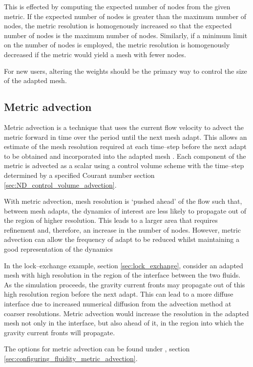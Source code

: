 This is effected by computing the expected number of nodes from the given metric. If the expected
number of nodes is greater than the maximum number of nodes, the metric resolution is homogenously
increased so that the expected number of nodes is the maximum number of nodes. Similarly, if a minimum
limit on the number of nodes is employed, the metric resolution is homogenously decreased if the metric
would yield a mesh with fewer nodes.

For new users, altering the weights should be the primary way to control the
size of the adapted mesh. 

\subsection{Metric advection}
\label{section:metric_advection_general}
Metric advection is a technique that uses the current flow velocity to advect the metric forward in time over the period until the next mesh adapt. This allows an estimate of the mesh resolution required at each time--step before the next adapt to be obtained and incorporated into the adapted mesh \citep{wilson_phdthesis_2009}. Each component of the metric is advected as a scalar using a control volume scheme with the time--step determined by a specified Courant number section \ref{sec:ND_control_volume_advection}. 

With metric advection, mesh resolution is `pushed ahead' of the flow such that, between mesh adapts, the dynamics of interest are less likely to propagate out of the region of higher resolution. This leads to a larger area that requires refinement and, therefore, an increase in the number of nodes. However, metric advection can allow the frequency of adapt to be reduced whilst maintaining a good representation of the dynamics

In the lock--exchange example, section \ref{sec:lock_exchange}, consider an adapted mesh with high resolution in the region of the interface between the two fluids. As the simulation proceeds, the gravity current fronts may propagate out of this high resolution region before the next adapt. This can lead to a more diffuse interface due to increased numerical diffusion from the advection method at coarser resolutions. Metric advection would increase the resolution in the adapted mesh not only in the interface, but also ahead of it, in the region into which the gravity current fronts will propagate. 

The options for metric advection can be found under , section \ref{sec:configuring_fluidity_metric_advection}.
 
